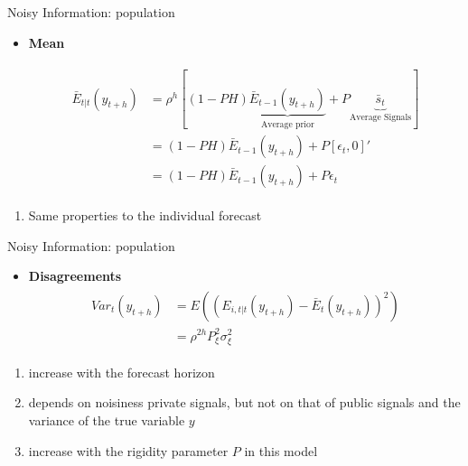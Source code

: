 \documentclass{beamer}
\begin{document}
\begin{frame}{Noisy Information: population}
\begin{itemize}
\item \textbf{Mean}

\begin{eqnarray*}
	\begin{aligned}
		\bar E_{t|t} (y_{t+h}) & = \rho^h [(1-PH) \underbrace{\bar E_{t-1}(y_{t+h})}_{\text{Average prior}} + P \underbrace{\bar s_{t}}_{\text{Average Signals}}] \\
		& = (1-PH) \bar E_{t-1}(y_{t+h}) + P [\epsilon_t, 0]' \\
		& = (1-PH) \bar E_{t-1}(y_{t+h}) + P \epsilon_t
	\end{aligned}
\end{eqnarray*}
\end{itemize}

\begin{enumerate}
	\item Same properties to the individual forecast 
\end{enumerate}

\end{frame}




\begin{frame}{Noisy Information: population}
\begin{itemize}
\item \textbf{Disagreements}
\begin{eqnarray*}
\begin{aligned}
	Var_t(y_{t+h}) & = E((E_{i,t|t}(y_{t+h}) - \bar E_t(y_{t+h}))^2) \\
	& = \rho^{2h} P^2_\xi \sigma^2_\xi  
\end{aligned}
\end{eqnarray*}
\end{itemize}

\begin{enumerate}
	\item increase with the forecast horizon
	\item depends on noisiness private signals, but not on that of public signals and the variance of the true variable $y$ 
	\item increase with the rigidity parameter $P$ in this model
\end{enumerate}

\end{frame}
\end{document}
